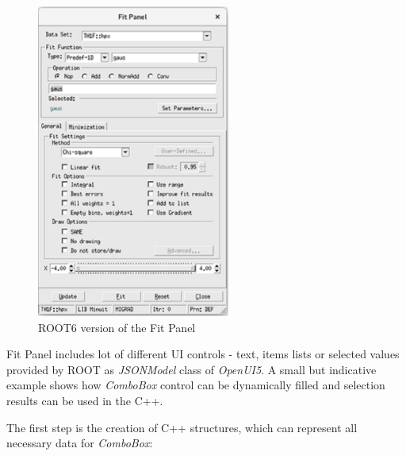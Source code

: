 \documentclass[a4paper]{jpconf}
\begin{document}
\begin{figure}[h]
\begin{minipage}{14pc}
\includegraphics[width=15pc]{oldPanel.eps}
\caption{\label{label}ROOT6 version of the Fit Panel}
\end{minipage}
\end{figure}


Fit Panel includes lot of different UI controls - text, items lists or selected values provided by ROOT as \textit{JSONModel} class of \textit{OpenUI5}. 
A small but indicative example shows how \textit{ComboBox} control can be dynamically filled and selection results can be used in the C++.

The first step is the creation of C++ structures, which can represent all necessary data for \textit{ComboBox}:
\end{document}
